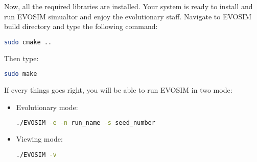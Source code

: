 \documentclass{article}
\begin{document}
Now, all the required libraries are installed. Your system is ready to install and run EVOSIM simualtor and enjoy the evolutionary staff.
Navigate to EVOSIM build directory and type the following command:
\begin{lstlisting}[language=bash]  
  	sudo cmake ..    
  \end{lstlisting}  
Then type:
\begin{lstlisting}[language=bash]  
  	sudo make    
  \end{lstlisting}
If every things goes right, you will be able to run EVOSIM in two mode:
\begin{itemize}
\item Evolutionary mode:
\begin{lstlisting}[language=bash]  
  	./EVOSIM -e -n run_name -s seed_number    
  \end{lstlisting} 
\item Viewing mode:
\begin{lstlisting}[language=bash]  
  	./EVOSIM -v    
  \end{lstlisting}
\end{itemize}

 
\end{document}
